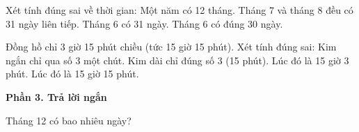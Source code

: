 \begin{ex} %
Xét tính đúng sai về thời gian:
\choiceTF
{\True Một năm có 12 tháng.}
{\True Tháng 7 và tháng 8 đều có 31 ngày liên tiếp.}
{Tháng 6 có 31 ngày.}
{\True Tháng 6 có đúng 30 ngày.}
\end{ex}

\begin{ex} %
Đồng hồ chỉ 3 giờ 15 phút chiều (tức 15 giờ 15 phút). Xét tính đúng sai:
\choiceTF
{\True Kim ngắn chỉ qua số 3 một chút.}
{\True Kim dài chỉ đúng số 3 (15 phút).}
{Lúc đó là 15 giờ 3 phút.}
{\True Lúc đó là 15 giờ 15 phút.}
\end{ex}

\textbf{Phần 3. Trả lời ngắn}

\begin{ex} %
Tháng 12 có bao nhiêu ngày?
\end{ex}

